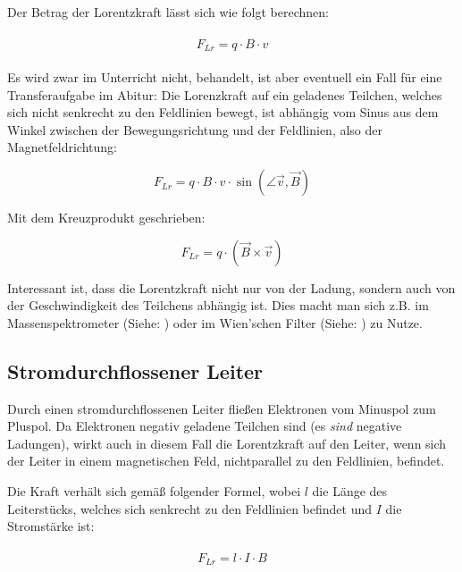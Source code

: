 Der Betrag der Lorentzkraft lässt sich wie folgt berechnen:

\begin{align} \label{eq:Lorentzkraft}
\begin{split}
	F_{Lr} = q \cdot B \cdot v
\end{split}
\end{align}

\begin{NiceToKnow}
	Es wird zwar im Unterricht nicht, behandelt, ist aber eventuell ein Fall für eine Transferaufgabe im Abitur: Die Lorenzkraft auf ein geladenes Teilchen, welches sich nicht senkrecht zu den Feldlinien bewegt, ist abhängig vom Sinus aus dem Winkel zwischen der Bewegungsrichtung und der Feldlinien, also der Magnetfeldrichtung:

	\begin{equation}
		F_{Lr} = q \cdot B \cdot v \cdot \sin{(\angle{\vec{v}, \vec{B}})}
	\end{equation}

	\noindent Mit dem Kreuzprodukt geschrieben:

	\begin{equation}
		F_{Lr} = q \cdot (\vec{B} \times \vec{v})
	\end{equation}
\end{NiceToKnow}

\noindent Interessant ist, dass die Lorentzkraft nicht nur von der Ladung, sondern auch von der Geschwindigkeit des Teilchens abhängig ist. Dies macht man sich z.B. im Massenspektrometer (Siehe: ) oder im Wien'schen Filter (Siehe: ) zu Nutze.

\subsection{Stromdurchflossener Leiter}

Durch einen stromdurchflossenen Leiter fließen Elektronen vom Minuspol zum Pluspol. Da Elektronen negativ geladene Teilchen sind (es \emph{sind} negative Ladungen), wirkt auch in diesem Fall die Lorentzkraft auf den Leiter, wenn sich der Leiter in einem magnetischen Feld, nichtparallel zu den Feldlinien, befindet.

Die Kraft verhält sich gemäß folgender Formel, wobei $l$ die Länge des Leiterstücks, welches sich senkrecht zu den Feldlinien befindet und $I$ die Stromstärke ist:

\begin{align}
\begin{split}
	F_{Lr} = l \cdot I \cdot B
\end{split}
\end{align}


